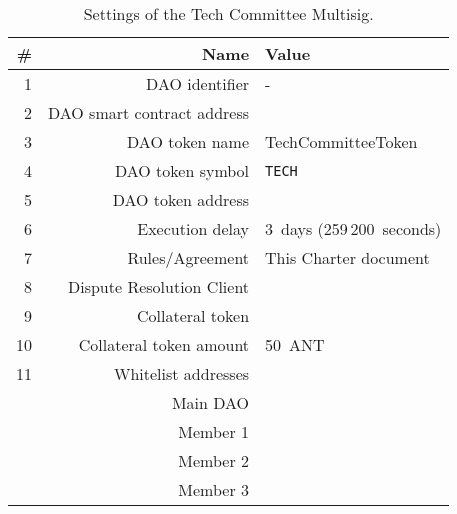 \begin{table}[h!]
	\caption{Settings of the Tech Committee Multisig.}
	\centering
	\begin{tabular}{rrl}
		\toprule
		\# & Name & Value \\
		\midrule
		1 & \ac{DAO} identifier & - \\
		2 & \ac{DAO} smart contract address & \techSubDaoAddr\\
		3 & \ac{DAO} token name & TechCommitteeToken\\
		4 & \ac{DAO} token symbol & \texttt{TECH}\\
		5 & \ac{DAO} token address & \techSubDaoTokenAddr\\
		6 & Execution delay & 3~days (259\,200~seconds)\\
		7 & Rules/Agreement & This Charter document\\
		8 & Dispute Resolution Client & \aragonCourtAddr\\
		9 & Collateral token & \antTokenAddr\\
		10 & Collateral token amount & 50~\ac{ANT}\\
		11 & Whitelist addresses \\
		& Main \ac{DAO} & \mainDaoAddr\\
		& Member 1 & \techSubDaoMemberAddrI\\
		& Member 2 & \techSubDaoMemberAddrII\\
		& Member 3 & \techSubDaoMemberAddrIII\\
		\bottomrule
	\end{tabular}
\end{table}




